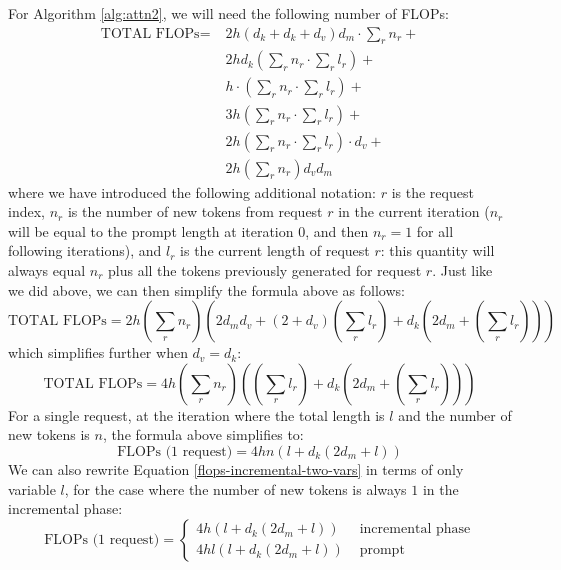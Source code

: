 For Algorithm \ref{alg:attn2}, we will need the following number of FLOPs:
\begin{align}
    \text{TOTAL FLOPs} = \; & 2 h (d_k + d_k + d_v) d_m \cdot \sum_r n_r + \\
    & 2 h d_k \left(\sum_r n_r \cdot \sum_r l_r \right) + \\
    & h \cdot \left(\sum_r n_r \cdot \sum_r l_r \right) + \\
    & 3h\left(\sum_r n_r \cdot \sum_r l_r \right) + \\
    & 2h \left(\sum_r n_r \cdot \sum_r l_r \right) \cdot d_v + \\
    & 2h\left(\sum_r n_r \right) d_v d_m
\end{align}
where we have introduced the following additional notation: $r$ is the request index, $n_r$ is the number of new tokens from request $r$ in the current iteration ($n_r$ will be equal to the prompt length at iteration $0$, and then $n_r=1$ for all following iterations), and $l_r$ is the current length of request $r$: this quantity will always equal $n_r$ plus all the tokens previously generated for request $r$.
Just like we did above, we can then simplify the formula above as follows:
\begin{equation}
    \text{TOTAL FLOPs} = 2 h \left(\sum_r n_r \right) \left(2 d_m d_v + \left(2 + d_v \right) \left(\sum_r l_r \right) + d_k \left(2 d_m + \left(\sum_r l_r \right) \right)\right)
\end{equation}
which simplifies further when $d_v = d_k$:
\begin{equation}
    \text{TOTAL FLOPs} = 4 h \left(\sum_r n_r \right) \left( \left(\sum_r l_r \right) + d_k \left(2 d_m + \left(\sum_r l_r \right) \right)\right)
\end{equation}
For a single request, at the iteration where the total length is $l$ and the number of new tokens is $n$, the formula above simplifies to:
\begin{equation}\label{flops-incremental-two-vars}
    \text{FLOPs (1 request)} = 4 h n \left( l + d_k \left(2 d_m + l \right)\right)
\end{equation}
We can also rewrite Equation \ref{flops-incremental-two-vars} in terms of only variable $l$, for the case where the number of new tokens is always $1$ in the incremental phase:
\begin{equation}\label{final-eq-new}
    \text{FLOPs (1 request)} = \begin{cases}
                              4 h \left( l + d_k \left(2 d_m + l \right)\right)  & \text{ incremental phase} \\
                              4 h l \left( l + d_k \left(2 d_m + l \right)\right) & \text{ prompt}
\end{cases}
\end{equation}
